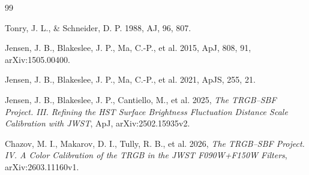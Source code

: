 \documentclass[10pt,a4paper,twocolumn]{article}
\begin{document}
\begin{thebibliography}{99}

Tonry, J. L., \& Schneider, D. P. 1988, AJ, 96, 807.

Jensen, J. B., Blakeslee, J. P., Ma, C.-P., et al. 2015,
ApJ, 808, 91, arXiv:1505.00400.

Jensen, J. B., Blakeslee, J. P., Ma, C.-P., et al. 2021,
ApJS, 255, 21.

Jensen, J. B., Blakeslee, J. P., Cantiello, M., et al. 2025,
\textit{The TRGB--SBF Project. III. Refining the HST Surface Brightness
Fluctuation Distance Scale Calibration with JWST},
ApJ, arXiv:2502.15935v2.

Chazov, M. I., Makarov, D. I., Tully, R. B., et al. 2026,
\textit{The TRGB--SBF Project. IV. A Color Calibration of the TRGB in the
JWST F090W+F150W Filters}, arXiv:2603.11160v1.

\end{thebibliography}
\end{document}
